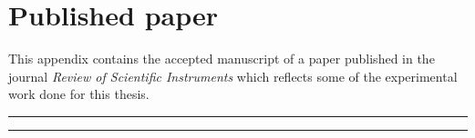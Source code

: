
\chapter{Published paper} %
\label{AppendixB} %

This appendix contains the accepted manuscript of a paper published in the
journal \textit{Review of Scientific Instruments} which reflects some of the
experimental work done for this thesis.

\vspace{1em}

\hrule

\vspace{1em}

\vspace{1em}


\vspace{1em}

\hrule


